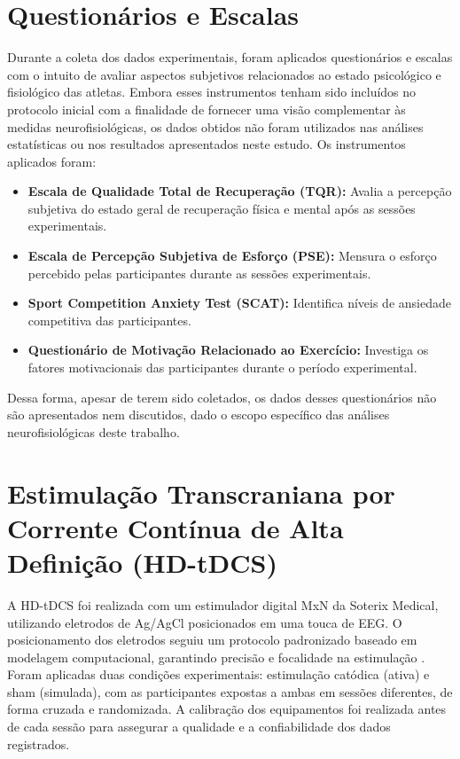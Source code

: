 \section{Questionários e Escalas}

Durante a coleta dos dados experimentais, foram aplicados questionários e escalas com o intuito de avaliar aspectos subjetivos relacionados ao estado psicológico e fisiológico das atletas. Embora esses instrumentos tenham sido incluídos no protocolo inicial com a finalidade de fornecer uma visão complementar às medidas neurofisiológicas, os dados obtidos não foram utilizados nas análises estatísticas ou nos resultados apresentados neste estudo. Os instrumentos aplicados foram:

\begin{itemize} \item \textbf{Escala de Qualidade Total de Recuperação (TQR):} Avalia a percepção subjetiva do estado geral de recuperação física e mental após as sessões experimentais. \item \textbf{Escala de Percepção Subjetiva de Esforço (PSE):} Mensura o esforço percebido pelas participantes durante as sessões experimentais. \item \textbf{Sport Competition Anxiety Test (SCAT):} Identifica níveis de ansiedade competitiva das participantes. \item \textbf{Questionário de Motivação Relacionado ao Exercício:} Investiga os fatores motivacionais das participantes durante o período experimental. \end{itemize}

Dessa forma, apesar de terem sido coletados, os dados desses questionários não são apresentados nem discutidos, dado o escopo específico das análises neurofisiológicas deste trabalho.

\section{Estimulação Transcraniana por Corrente Contínua de Alta Definição (HD-tDCS)}

A HD-tDCS foi realizada com um estimulador digital MxN da Soterix Medical, utilizando eletrodos de Ag/AgCl posicionados em uma touca de EEG. O posicionamento dos eletrodos seguiu um protocolo padronizado baseado em modelagem computacional, garantindo precisão e focalidade na estimulação \cite{datta2008transcranial}. Foram aplicadas duas condições experimentais: estimulação catódica (ativa) e sham (simulada), com as participantes expostas a ambas em sessões diferentes, de forma cruzada e randomizada. A calibração dos equipamentos foi realizada antes de cada sessão para assegurar a qualidade e a confiabilidade dos dados registrados.

